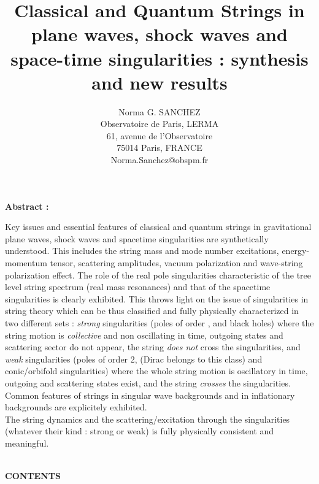 \documentclass[12pt,a4paper]{article}
\begin{document}
\sloppy
\title{{\bf Classical and Quantum Strings in plane waves, shock waves and space-time singularities : synthesis and new results}}
\author{Norma G. SANCHEZ \\
Observatoire de Paris, LERMA\\61, avenue de l'Observatoire\\75014 Paris, 
FRANCE\\Norma.Sanchez@obspm.fr}
\date{ }
\maketitle

\begin{center}
{\bf Abstract : }  
\end{center}
Key issues and essential features of classical and quantum strings in 
gravitational plane waves, shock waves and spacetime singularities are 
synthetically understood. This includes the string mass and mode number 
excitations, energy-momentum tensor, scattering amplitudes, vacuum 
polarization and wave-string polarization effect. The role of the real 
pole singularities characteristic of the tree level string spectrum 
(real mass resonances) and that of the spacetime singularities is clearly 
exhibited. This throws light on the issue of singularities in string 
theory which can be thus classified and fully physically characterized in two 
different sets : {\it strong} singularities (poles of order \coordHE{}, 
and black holes) where the string motion is {\it collective} and non 
oscillating in time, outgoing states and scattering sector do not appear, 
the string {\it does not} cross the singularities, and {\it weak} singularities (poles of order \myHighlight{$<$}\coordHE{} 2, (Dirac \myHighlight{$\delta $}\coordHE{} 
belongs to this class) and conic/orbifold singularities) where the whole 
string 
motion is oscillatory in time, outgoing and scattering states exist, and 
the string {\it crosses} the singularities. \\
Common features of strings in singular wave backgrounds and in inflationary backgrounds are explicitely exhibited. \\
The string dynamics and the scattering/excitation through the singularities 
(whatever their kind : strong or weak) is fully physically 
consistent and meaningful.\\ \\
\begin{center}
{\bf CONTENTS}
\end{center}
\end{document}
